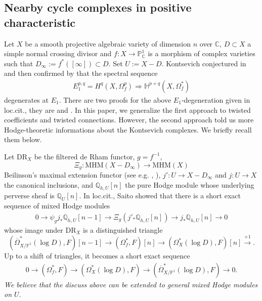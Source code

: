 \documentclass[12pt, a4paper]{article}
\begin{document}
\subsection{Nearby cycle complexes in positive characteristic}
Let $X$ be a smooth projective algebraic variety of dimension $n$ over $\mathbb C$, $D\subset X$ a simple normal crossing divisor and $f:X\to\mathbb P^1_\mathbb{C}$ is a morphism of complex varieties such that $D_\infty:=f^*([\infty])\subset D$. Set $U:=X-D$. Kontsevich conjectured in \cite{Kon} and then confirmed by \cite[Theorem 1.3.2]{ESY} that the spectral sequence 
\begin{eqnarray}\label{E_1 char 0}
E_1^{p,q}=H^q(X,\Omega_f^p)\Rightarrow \mathbb H^{p+q}(X,\Omega^*_f)
\end{eqnarray}
degenerates at $E_1$. There are two proofs for the above $E_1$-degeneration given in loc.cit., they are \cite[Appendix D]{ESY} and \cite[Appendix E]{ESY}. In this paper, we generalize the first approach to twisted coefficients and twisted connections. However, the second approach told us more Hodge-theoretic informations about the Kontsevich complexes. We briefly recall them below.
 
 Let $\mathrm{DR}_X$ be the filtered de Rham functor, $g=f^{-1}$, 
$$\Xi_g:\mathrm{MHM}(X-D_\infty)\to\mathrm{MHM}(X)$$
  Beilinson's maximal extension functor (see e.g. \cite{Bei}, \cite[(E.1.5.2)]{ESY}), $j':U\to X-D_\infty$ and $j:U\to X$ the canonical  inclusions, and $\mathbb Q_{h,U}[n]$ the pure Hodge module whose underlying perverse  sheaf is $\mathbb Q_U[n]$. In loc.cit., Saito showed that there is a short exact sequence of mixed Hodge modules 
 \begin{eqnarray}\label{ses MHM}
  0\to\psi_gj_*\mathbb Q_{h,U}[n-1]\to\Xi_g(j'_*\mathbb Q_{h,U}[n])\to j_*\mathbb Q_{h,U}[n]\to0
  \end{eqnarray}
  whose image under $\mathrm{DR}_X$ is a distinguished triangle
$$
(\overline\Omega^*_{X/\mathbb P^1}(\log D),F)[n-1]\to(\Omega^*_f,F)[n]\to(\Omega^*_X(\log D),F)[n]\stackrel{+1}{\longrightarrow}.
$$
Up to a shift of triangles, it becomes a short exact sequence
\begin{eqnarray}\label{ses DR}
0\to(\Omega^*_f,F)\to(\Omega^*_X(\log D),F)\to(\overline\Omega^*_{X/\mathbb P^1}(\log D),F)\to0.
\end{eqnarray}
\emph{We believe that the discuss above can be extended to general mixed Hodge modules on $U$.}
 
\end{document}
